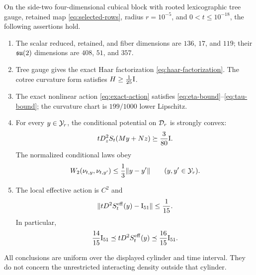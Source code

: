 \begin{theorem}\label{thm:main}
On the side-two four-dimensional cubical block with rooted lexicographic tree
gauge, retained map \eqref{eq:selected-rows}, radius $r=10^{-5}$, and
$0<t\le10^{-18}$, the following assertions hold.

\begin{enumerate}
\item The scalar reduced, retained, and fiber dimensions are $136$, $17$, and
$119$; their $\mathfrak{su}(2)$ dimensions are $408$, $51$, and $357$.
\item Tree gauge gives the exact Haar factorization
\eqref{eq:haar-factorization}.  The cotree curvature form satisfies
$H\ge\frac1{25}\mathrm I$.
\item The exact nonlinear action \eqref{eq:exact-action} satisfies
\eqref{eq:eta-bound}--\eqref{eq:tau-bound}; the curvature chart is
$199/1000$ lower Lipschitz.
\item For every $y\in\mathcal Y_r$, the conditional potential on $\mathcal D_r$ is strongly
convex:
\begin{equation}\label{eq:fiber-convexity}
 tD_z^2S_t(My+Nz)\succeq\frac3{80}\mathrm I.
\end{equation}
The normalized conditional laws obey
\begin{equation}\label{eq:transport-bound}
 W_2(\nu_{t,y},\nu_{t,y'})\le\frac13\lVert y-y'\rVert
 \qquad(y,y'\in\mathcal Y_r).
\end{equation}
\item The local effective action is $C^2$ and
\begin{equation}\label{eq:effective-hessian-bound}
 \lVert tD^2S_t^{\mathrm{eff}}(y)-\mathrm I_{51}\rVert\le\frac1{15}.
\end{equation}
In particular,
\begin{equation}\label{eq:effective-coercivity}
 \frac{14}{15}\mathrm I_{51}\preceq tD^2S_t^{\mathrm{eff}}(y)
 \preceq\frac{16}{15}\mathrm I_{51}.
\end{equation}
\end{enumerate}
All conclusions are uniform over the displayed cylinder and time interval.
They do not concern the unrestricted interacting density outside that
cylinder.
\end{theorem}

